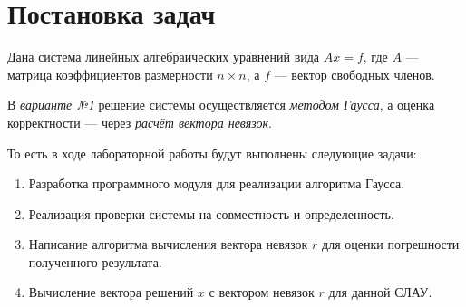 \section{Постановка задач}

Дана система линейных алгебраических уравнений вида \( Ax=f \), где \( A \) --- матрица коэффициентов размерности \( n \times n \), а \( f \) --- вектор свободных членов.

В \textit{варианте №1} решение системы осуществляется \textit{методом Гаусса}, а оценка корректности --- через \textit{расчёт вектора невязок}.

То есть в ходе лабораторной работы будут выполнены следующие задачи:

\begin{enumerate}
    \item Разработка программного модуля для реализации алгоритма Гаусса.
    \item Реализация проверки системы на совместность и определенность.
    \item Написание алгоритма вычисления вектора невязок \( r \) для оценки погрешности полученного результата.
    \item Вычисление вектора решений \( x \) с вектором невязок \( r \) для данной СЛАУ.
\end{enumerate}